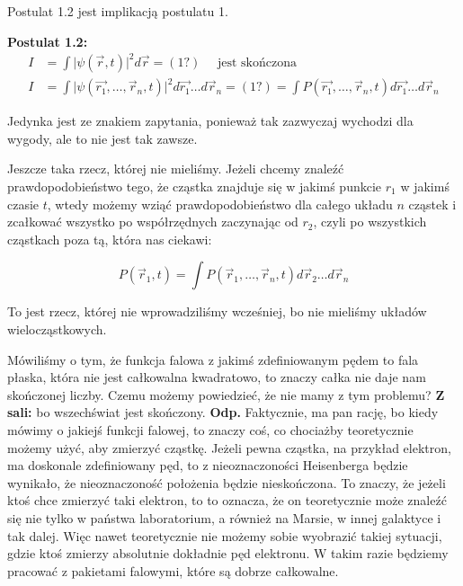 Postulat 1.2 jest implikacją postulatu 1.

\textbf{Postulat 1.2:}
\begin{equation*}
	\begin{split}
		I &= \int \vert \psi(\vec{r}, t)\vert^2 d\vec{r} = (1?) \quad \text{ jest skończona} \\
		I &= \int \vert \psi (\vec{r_1}, \dots, \vec{r}_n, t)\vert^2 d\vec{r_1}\dots d\vec{r}_n = (1?) = \int P(\vec{r_1}, \dots, \vec{r}_n, t)d\vec{r_1}\dots d\vec{r}_n
	\end{split}
\end{equation*}

Jedynka jest ze znakiem zapytania, ponieważ tak zazwyczaj wychodzi dla wygody, ale to nie jest tak zawsze.

\iffalse %
\textbf{Komentarz z sali:} Implikacja mi się wydaje, że może być tylko dlatego, bo chcemy mieć dowolną informację, a to daje nam informację o prawdopodobieństwie położenia, więc jakby to było nieskończone, to byśmy tracili jakąś informację. To jedyne, co mogę wymyślić, dlaczego to jest implikacja, a nie postulat 1.2. \textbf{Odp.} No racja, faktycznie można tak powiedzieć.
\fi

Jeszcze taka rzecz, której nie mieliśmy. Jeżeli chcemy znaleźć prawdopodobieństwo tego, że cząstka znajduje się w jakimś punkcie $r_1$ w jakimś czasie $t$, wtedy możemy wziąć prawdopodobieństwo dla całego układu $n$ cząstek i zcałkować wszystko po współrzędnych zaczynając od $r_2$, czyli po wszystkich cząstkach poza tą, która nas ciekawi:

\begin{equation*}
	P(\vec{r}_1, t) = \int P (\vec{r}_1, \dots, \vec{r}_n, t) d\vec{r}_2\dots d\vec{r}_n
\end{equation*}

To jest rzecz, której nie wprowadziliśmy wcześniej, bo nie mieliśmy układów wielocząstkowych.

Mówiliśmy o tym, że funkcja falowa z jakimś zdefiniowanym pędem to fala płaska, która nie jest całkowalna kwadratowo, to znaczy całka nie daje nam skończonej liczby. Czemu możemy powiedzieć, że nie mamy z tym problemu? \textbf{Z sali:} bo wszechświat jest skończony. \textbf{Odp.} Faktycznie, ma pan rację, bo kiedy mówimy o jakiejś funkcji falowej, to znaczy coś, co chociażby teoretycznie możemy użyć, aby zmierzyć cząstkę. Jeżeli pewna cząstka, na przykład elektron, ma doskonale zdefiniowany pęd, to z nieoznaczoności Heisenberga będzie wynikało, że nieoznaczoność położenia będzie nieskończona. To znaczy, że jeżeli ktoś chce zmierzyć taki elektron, to to oznacza, że on teoretycznie może znaleźć się nie tylko w państwa laboratorium, a również na Marsie, w innej galaktyce i tak dalej. Więc nawet teoretycznie nie możemy sobie wyobrazić takiej sytuacji, gdzie ktoś zmierzy absolutnie dokładnie pęd elektronu. W takim razie będziemy pracować z pakietami falowymi, które są dobrze całkowalne.


